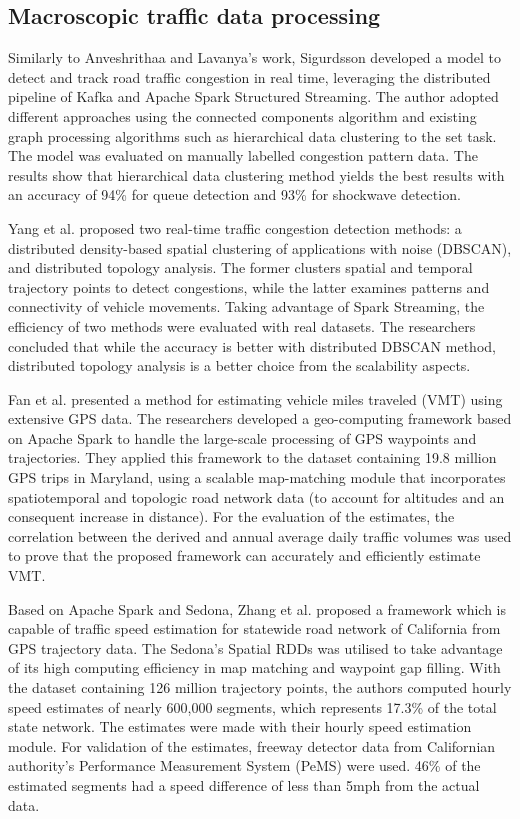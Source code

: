 \documentclass{article}
\begin{document}
\subsection{Macroscopic traffic data processing}
\label{sec:macroscopic}
Similarly to Anveshrithaa and Lavanya's work, Sigurdsson\cite{Sigurdsson2018RoadTC} developed a model to detect and track road traffic congestion in real time, leveraging the distributed pipeline of Kafka and Apache Spark Structured Streaming. The author adopted different approaches using the connected components algorithm and existing graph processing algorithms such as hierarchical data clustering to the set task. The model was evaluated on manually labelled congestion pattern data. The results show that hierarchical data clustering method yields the best results with an accuracy of 94\% for queue detection and 93\% for shockwave detection. 

Yang et al.\cite{Yang2019} proposed two real-time traffic congestion detection methods: a distributed density-based spatial clustering of applications with noise (DBSCAN), and distributed topology analysis. The former clusters spatial and temporal trajectory points to detect congestions, while the latter examines patterns and connectivity of vehicle movements. Taking advantage of Spark Streaming, the efficiency of two methods were evaluated with real datasets. The researchers concluded that while the accuracy is better with distributed DBSCAN method, distributed topology analysis is a better choice from the scalability aspects.

Fan et al.\cite{FAN2019298} presented a method for estimating vehicle miles traveled (VMT) using extensive GPS data. The researchers developed a geo-computing framework based on Apache Spark to handle the large-scale processing of GPS waypoints and trajectories. They applied this framework to the dataset containing 19.8 million GPS trips in Maryland, using a scalable map-matching module that incorporates spatiotemporal and topologic road network data (to account for altitudes and an consequent increase in distance). For the evaluation of the estimates, the correlation between the derived and annual average daily traffic volumes was used to prove that the proposed framework can accurately and efficiently estimate VMT.

Based on Apache Spark and Sedona, Zhang et al.\cite{Zhang20231124} proposed a framework which is capable of traffic speed estimation for statewide road network of California from GPS trajectory data. The Sedona's Spatial RDDs was utilised to take advantage of its high computing efficiency in map matching and waypoint gap filling. With the dataset containing 126 million trajectory points, the authors computed hourly speed estimates of nearly 600,000 segments, which represents 17.3\% of the total state network. The estimates were made with their hourly speed estimation module. For validation of the estimates, freeway detector data from Californian authority's Performance Measurement System (PeMS) were used. 46\% of the estimated segments had a speed difference of less than 5mph from the actual data. 
\end{document}

